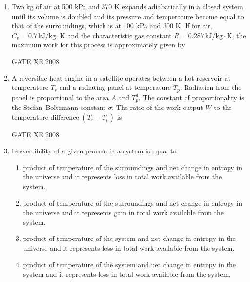 \documentclass[12pt]{article}
\begin{document}
\begin{enumerate}[label=Q\arabic*.]
\item  Two kg of air at 500 kPa and 370 K expands adiabatically in a closed system until its volume is doubled and its pressure and temperature become equal to that of the surroundings, which is at 100 kPa and 300 K. If for air, $C_v = 0.7 \, \mathrm{kJ/kg \cdot K}$ and the characteristic gas constant $R = 0.287 \, \mathrm{kJ/kg \cdot K}$, the maximum work for this process is approximately given by

\begin{enumerate}[label=(\Alph*)]
\end{enumerate}

GATE XE 2008

\item  A reversible heat engine in a satellite operates between a hot reservoir at temperature $T_r$ and a radiating panel at temperature $T_p$. Radiation from the panel is proportional to the area $A$ and $T_p^4$. The constant of proportionality is the Stefan–Boltzmann constant $\sigma$. The ratio of the work output $W$ to the temperature difference $(T_r - T_p)$ is  

\begin{enumerate}[label=(\Alph*)]
\end{enumerate}

GATE XE 2008

\item Irreversibility of a given process in a system is equal to  

\begin{enumerate}[label=(\Alph*)]
\item  product of temperature of the surroundings and net change in entropy in the universe and it represents loss in total work available from the system.  
 \item  product of temperature of the surroundings and net change in entropy in the universe and it represents gain in total work available from the system.  
 \item  product of temperature of the system and net change in entropy in the universe and it represents loss in total work available from the system. 
  \item  product of temperature of the system and net change in entropy in the system and it represents loss in total work available from the system.
 \end{enumerate}
 

\end{enumerate}
\end{document}
